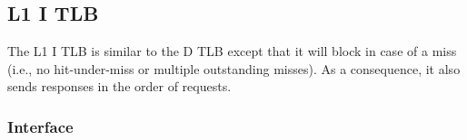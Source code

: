 \subsection{L1 I TLB}

The L1 I TLB is similar to the D TLB except that it will block in case of a miss (i.e., no hit-under-miss or multiple outstanding misses).
As a consequence, it also sends responses in the order of requests.

\subsubsection{Interface}

\begin{figure}
\begin{lstlisting}[caption={}]

\end{lstlisting}
\end{figure}